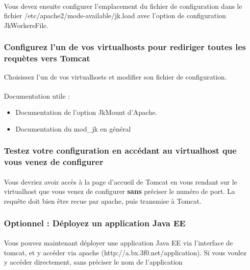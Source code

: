 \documentclass[12pt,a4paper]{article}
\begin{document}
\paragraph{}
Vous devez ensuite configurer l'emplacement du fichier de configuration dans le fichier /etc/apache2/mods-available/jk.load avec l'option de configuration JkWorkersFile.

\subsubsection{Configurez l'un de vos virtualhosts pour rediriger toutes les requètes vers Tomcat}
Choisissez l'un de vos virtualhosts et modifier son fichier de configuration.

\paragraph{}
Documentation utile : 
\begin{itemize}
\item Documentation de l'option JkMount d'Apache.
\item Documentation du mod\_jk en général
\end{itemize}

\subsubsection{Testez votre configuration en accédant au virtualhost que vous venez de configurer}
\paragraph{}
Vous devriez avoir accès à la page d'accueil de Tomcat en vous rendant sur le virtualhost que vous venez de configurer \textbf{sans} préciser le numéro de port. La requête doit bien être recue par apache, puis transmise à Tomcat.

\subsubsection{Optionnel : Déployez un application Java EE}
\paragraph{}
Vous pouvez maintenant déployer une application Java EE via l'interface de tomcat, et y accéder via apache (http://a.bx.3f0.net/application). Si vous voulez y accéder directement, sans préciser le nom de l'application
\end{document}
